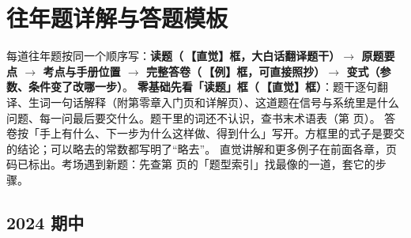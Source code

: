 \providecommand{\rd}[2]{（入门 p.\,\pageref{#1}，详见 p.\,\pageref{#2}）}
\providecommand{\rdd}[1]{（详见 p.\,\pageref{#1}）}
\chapter{往年题详解与答题模板}\label{ch:exams}

\begin{idea}[怎么用这一章]
每道往年题按同一个顺序写：\textbf{读题（\icoI\,【直觉】框，大白话翻译题干）$\to$ 原题要点 $\to$ 考点与手册位置 $\to$ 完整答卷（\icoE\,【例】框，可直接照抄）$\to$ 变式（参数、条件变了改哪一步）}。
\textbf{零基础先看「读题」框（\icoI\,【直觉】框）}：题干逐句翻译、生词一句话解释（附第零章入门页和详解页）、这道题在信号与系统里是什么问题、每一问最后要交什么。题干里的词还不认识，查书末术语表（第 \pageref{tab:glossary} 页）。
答卷按「手上有什么、下一步为什么这样做、得到什么」写开。方框里的式子是要交的结论；可以略去的常数都写明了“略去”。
直觉讲解和更多例子在前面各章，页码已标出。考场遇到新题：先查第 \pageref{tab:typeindex} 页的「题型索引」找最像的一道，套它的步骤。
\end{idea}

\section{2024 期中}\label{sec:ex2024}

